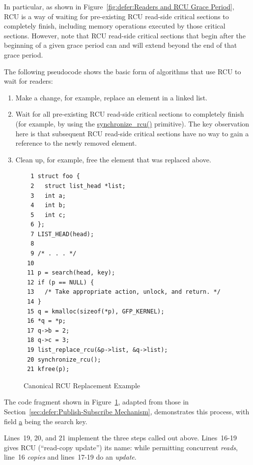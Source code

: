 In particular, as shown in
Figure~\ref{fig:defer:Readers and RCU Grace Period},
RCU is a way of
waiting for pre-existing RCU read-side critical sections to completely
finish, including memory operations executed by those critical sections.
However, note that RCU read-side critical sections
that begin after the beginning
of a given grace period can and will extend beyond the end of that grace
period.

The following pseudocode shows the basic form of algorithms that use
RCU to wait for readers:

\begin{enumerate}
\item	Make a change, for example, replace an element in a linked list.
\item	Wait for all pre-existing RCU read-side critical sections to
	completely finish (for example, by using the
	\url{synchronize_rcu()} primitive).
	The key observation here is that subsequent RCU read-side critical
	sections have no way to gain a reference to the newly removed
	element.
\item	Clean up, for example, free the element that was replaced above.
\end{enumerate}

\begin{figure}[tbp]
{ \scriptsize
\begin{verbatim}
  1 struct foo {
  2   struct list_head *list;
  3   int a;
  4   int b;
  5   int c;
  6 };
  7 LIST_HEAD(head);
  8
  9 /* . . . */
 10
 11 p = search(head, key);
 12 if (p == NULL) {
 13   /* Take appropriate action, unlock, and return. */
 14 }
 15 q = kmalloc(sizeof(*p), GFP_KERNEL);
 16 *q = *p;
 17 q->b = 2;
 18 q->c = 3;
 19 list_replace_rcu(&p->list, &q->list);
 20 synchronize_rcu();
 21 kfree(p);
\end{verbatim}
}
\caption{Canonical RCU Replacement Example}
\label{fig:defer:Canonical RCU Replacement Example}
\end{figure}

The code fragment shown in
Figure~\ref{fig:defer:Canonical RCU Replacement Example},
adapted from those in Section~\ref{sec:defer:Publish-Subscribe Mechanism},
demonstrates this process, with field \url{a} being the search key.

Lines~19, 20, and 21 implement the three steps called out above.
Lines~16-19 gives RCU (``read-copy update'') its name: while permitting
concurrent \emph{reads}, line~16 \emph{copies} and lines~17-19
do an \emph{update}.


